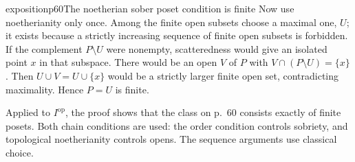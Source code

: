 \begin{dcomment}{exposition}{p60}{The noetherian sober poset condition is finite}
Now use noetherianity only once. Among the finite open subsets choose a maximal one, $U$; it exists because a strictly increasing sequence of finite open subsets is forbidden. If the complement $P\setminus U$ were nonempty, scatteredness would give an isolated point $x$ in that subspace. There would be an open $V$ of $P$ with $V\cap(P\setminus U)=\{x\}$. Then $U\cup V=U\cup\{x\}$ would be a strictly larger finite open set, contradicting maximality. Hence $P=U$ is finite.

Applied to $I^{\mathrm{op}}$, the proof shows that the class on p.~60 consists exactly of finite posets. Both chain conditions are used: the order condition controls sobriety, and topological noetherianity controls opens. The sequence arguments use classical choice.
\end{dcomment}
